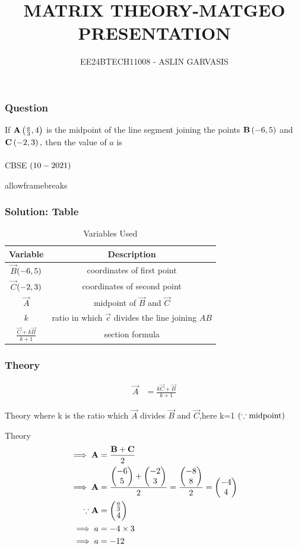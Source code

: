 \documentclass{beamer}
\begin{document}
\title{MATRIX THEORY-MATGEO PRESENTATION}
\author{EE24BTECH11008 - ASLIN GARVASIS}
\date{}
\frame{\titlepage}

\begin{frame}
\frametitle{Question}
If $\mathbf{A}\left(\frac{a}{3},4\right)$ is the midpoint of the line segment joining the points $\mathbf{B}\left(-6,5\right)$ and $\mathbf{C}\left(-2,3\right),$  
		then the value of $a$ is\\ \\
  \hfill{CBSE $\left(10-2021\right)$}
  \end{frame}
  \begin{frame}{allowframebreaks}
\frametitle{Solution: Table}
\begin{table}[h!!]
    \centering
    \begin{tabular}{|c|c|}
\hline
\textbf{Variable}& \textbf{Description}
\\\hline
$\vec{B}$$\left(-6,5\right)$ &  coordinates of first point\\
    \hline 
        $\vec{C}$$\left(-2,3\right)$ & coordinates of second point\\
    \hline
        $\vec{A}$& midpoint of $\vec{B}$ and $\vec{C}$\\ 
    \hline
        $k$ & ratio in which $\vec{c}$ divides the line joining $AB$\\
    \hline
	$\frac{\vec{C}+k\vec{B}}{k+1}$ & section formula\\
    \hline
\end{tabular}
    \caption{Variables Used}
\end{table}
\end{frame}
\begin{frame}
\frametitle{Theory}
\begin{align}
 \vec{A} &=\frac{k\vec{C}+\vec{B}}{k+1}
\end{align}
\end{frame}
\begin{frame}{Theory}
    where k is the ratio which $\vec{A}$ divides $\vec{B}$ and $\vec{C}$,\quad here k=1 $\left(\because \text{midpoint}\right)$\\
\end{frame}
\begin{frame}{Theory}
\begin{align}
\implies \mathbf{A}&=\frac{\mathbf{B}+\mathbf{C}}{2}\\ 
\implies \mathbf{A}&=\frac{\begin{pmatrix}-6\\5\end{pmatrix}+\begin{pmatrix}-2\\3\end{pmatrix}}{2}=\frac{\begin{pmatrix}-8\\8\end{pmatrix}}{2}=\begin{pmatrix}-4\\4\end{pmatrix}\\
\because \mathbf{A}&=\begin{pmatrix}\frac{a}{3}\\4\end{pmatrix}\\
\implies a&=-4\times3\\ 
\implies a&=-12
\end{align}    
\end{frame}
\end{document}
